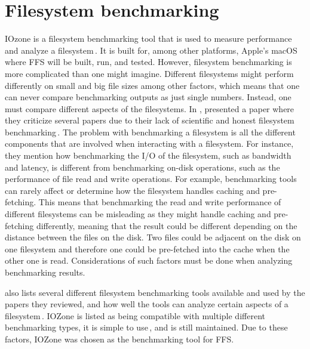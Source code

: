 \section{Filesystem benchmarking}
\label{sec:iozone}
IOzone is a filesystem benchmarking tool that is used to measure performance and analyze a filesystem\,\cite{IozoneFilesystemBenchmark2016}. It is built for, among other platforms, Apple's macOS where \gls{FFS} will be built, run, and tested. However, filesystem benchmarking is more complicated than one might imagine. Different filesystems might perform differently on small and big file sizes among other factors, which means that one can never compare benchmarking outputs as just single numbers. Instead, one must compare different aspects of the filesystems. In \citeyear{tarasovBenchmarkingFileSystem2011}, \citeauthor{tarasovBenchmarkingFileSystem2011} presented a paper where they criticize several papers due to their lack of scientific and honest filesystem benchmarking\,\cite{tarasovBenchmarkingFileSystem2011}. The problem with benchmarking a filesystem is all the different components that are involved when interacting with a filesystem. For instance, they mention how benchmarking the \gls{I/O} of the filesystem, such as bandwidth and latency, is different from benchmarking \mbox{on-disk} operations, such as the performance of file read and write operations. For example, benchmarking tools can rarely affect or determine how the filesystem handles caching and \mbox{pre-fetching}. This means that benchmarking the read and write performance of different filesystems can be misleading as they might handle caching and \mbox{pre-fetching} differently, meaning that the result could be different depending on the distance between the files on the disk. Two files could be adjacent on the disk on one filesystem and therefore one could be \mbox{pre-fetched} into the cache when the other one is read. Considerations of such factors must be done when analyzing benchmarking results.

\citeauthor{tarasovBenchmarkingFileSystem2011} also lists several different filesystem benchmarking tools available and used by the papers they reviewed, and how well the tools can analyze certain aspects of a filesystem\,\cite{tarasovBenchmarkingFileSystem2011}. IOZone is listed as being compatible with multiple different benchmarking types, it is simple to use\,\cite{agarwalComparingIOBenchmarks2018}, and is still maintained. Due to these factors, IOZone was chosen as the benchmarking tool for \gls{FFS}.